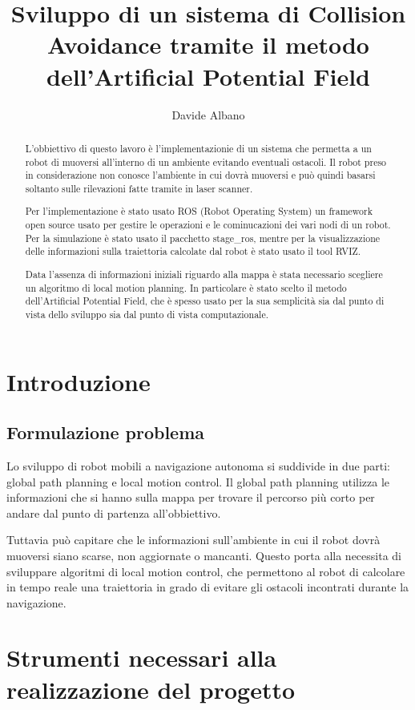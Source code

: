 \documentclass[Lau, binding=0.6cm, oneside]{sapthesis}
\title{Sviluppo di un sistema di Collision Avoidance tramite il metodo dell'Artificial Potential Field}
\author{Davide Albano}
\begin{document}
\maketitle
\begin{abstract}
L'obbiettivo di questo lavoro è l'implementazionie di un sistema che permetta a un robot di muoversi all'interno di un ambiente evitando eventuali ostacoli.
Il robot preso in considerazione non conosce l'ambiente in cui dovrà muoversi e può quindi basarsi soltanto sulle rilevazioni fatte tramite in laser scanner.

Per l'implementazione è stato usato ROS (Robot Operating System) un framework open source usato per gestire le operazioni e le cominucazioni dei vari nodi di un robot.
Per la simulazione è stato usato il pacchetto stage\_ros, mentre per la visualizzazione delle informazioni sulla traiettoria calcolate dal robot è stato usato il tool RVIZ.

Data l'assenza di informazioni iniziali riguardo alla mappa è stata necessario scegliere un algoritmo di local motion planning.
In particolare è stato scelto il metodo dell'Artificial Potential Field, che è spesso usato per la sua semplicità sia dal punto di vista dello sviluppo sia dal punto di vista computazionale.
\end{abstract}
\tableofcontents

\chapter{Introduzione}
\section{Formulazione problema}
Lo sviluppo di robot mobili a navigazione autonoma si suddivide in due parti: global path planning e local motion control.
Il global path planning utilizza le informazioni che si hanno sulla mappa per trovare il percorso più corto per andare dal punto di partenza all'obbiettivo.

Tuttavia può capitare che le informazioni sull'ambiente in cui il robot dovrà muoversi siano scarse, non aggiornate o mancanti.
Questo porta alla necessita di sviluppare algoritmi di local motion control, che permettono al robot di calcolare in tempo reale una traiettoria in grado di evitare gli ostacoli incontrati durante la navigazione.

\chapter{Strumenti necessari alla realizzazione del progetto}
\end{document}
